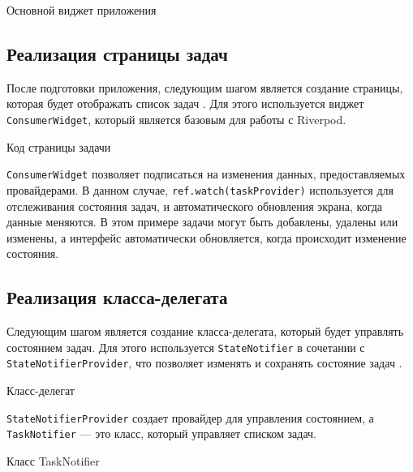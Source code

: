 \begin{image}
	\caption{Основной виджет приложения}
	\label{fig:riverpod:app}
\end{image}

\subsection{Реализация страницы задач}

После подготовки приложения, следующим шагом является создание страницы,
которая будет отображать список задач .
Для этого используется виджет \texttt{ConsumerWidget},
который является базовым для работы с Riverpod.

\begin{image}
	\caption{Код страницы задачи}
	\label{fig:riverpod:list:screen}
\end{image}

\texttt{ConsumerWidget} позволяет подписаться на изменения данных,
предоставляемых провайдерами.
В данном случае, \texttt{ref.watch(taskProvider)} используется
для отслеживания состояния задач,
и автоматического обновления экрана, когда данные меняются.
В этом примере задачи могут быть добавлены, удалены или изменены,
а интерфейс автоматически обновляется, когда происходит изменение состояния.

\subsection{Реализация класса-делегата}

Следующим шагом является создание класса-делегата,
который будет управлять состоянием задач.
Для этого используется \texttt{StateNotifier}
в сочетании с \texttt{StateNotifierProvider}, что позволяет изменять
и сохранять состояние задач .

\begin{image}
	\caption{Класс-делегат}
	\label{fig:riverpod:provider}
\end{image}

\texttt{StateNotifierProvider} создает провайдер для управления состоянием,
а \texttt{TaskNotifier} --- это класс, который управляет списком задач.

\begin{image}
	\caption{Класс TaskNotifier}
	\label{fig:riverpod:notifier}
\end{image}

